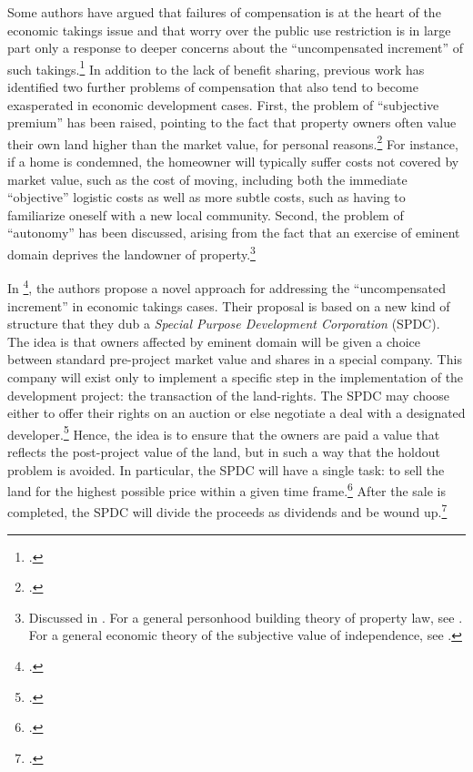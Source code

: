 Some authors have argued that failures of compensation is at the heart of the economic takings issue and that worry over the public use restriction is in large part only a response to deeper concerns about the ``uncompensated increment'' of such takings.\footcite[See][962]{fennell04} In addition to the lack of benefit sharing, previous work has identified two further problems of compensation that also tend to become exasperated in economic development cases. First, the problem of ``subjective premium'' has been raised, pointing to the fact that property owners often value their own land higher than the market value, for personal reasons.\footcite[963]{fennell04} For instance, if a home is condemned, the homeowner will typically suffer costs not covered by market value, such as the cost of moving, including both the immediate ``objective'' logistic costs as well as more subtle costs, such as having to familiarize oneself with a new local community. Second, the problem of ``autonomy'' has been discussed, arising from the fact that an exercise of eminent domain deprives the landowner of  property.\footnote{Discussed in \cite[966-967]{fennell04}. For a general personhood building theory of property law, see \cite{radin93}. For a general economic theory of the subjective value of independence, see \cite{benz08}.}

In \footcite{lehavi07}, the authors propose a novel approach for addressing the ``uncompensated increment'' in economic takings cases. Their proposal is based on a new kind of structure that they dub a {\it Special Purpose Development Corporation} (SPDC). The idea is that owners affected by eminent domain will be given a choice between standard pre-project market value and shares in a special company. This company will exist only to implement a specific step in the implementation of the development project: the transaction of the land-rights. The SPDC may choose either to offer their rights on an auction or else negotiate a deal with a designated developer.\footcite[1735]{lehavi07} Hence, the idea is to ensure that the owners are paid a value that reflects the post-project value of the land, but in such a way that the holdout problem is avoided. In particular, the SPDC will have a single task: to sell the land for the highest possible price within a given time frame.\footcite[1741]{lehavi07} After the sale is completed, the SPDC will divide the proceeds as dividends and be wound up.\footcite[1741]{lehavi07}

